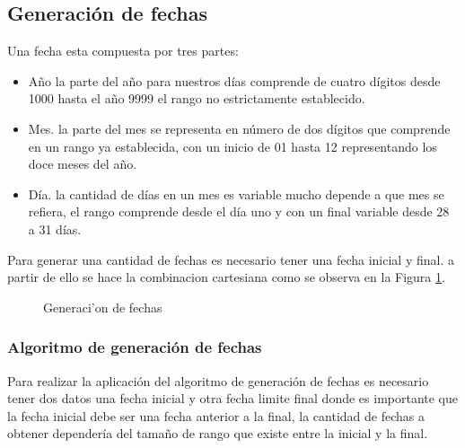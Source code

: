 \subsection{Generaci\'on de fechas}
Una fecha esta compuesta por tres partes:
\begin{itemize}
\item A\~no la parte del a\~no para nuestros d\'ias comprende de cuatro d\'igitos desde 1000 hasta el a\~no 9999 el rango no estrictamente establecido.
\item
Mes. la parte del mes se representa en n\'umero de dos d\'igitos que comprende en un rango ya establecida, con un inicio de 01 hasta 12 representando los doce meses del a\~no.
\item
 D\'ia. la cantidad de d\'ias en un mes es variable mucho depende a que mes se refiera, el rango comprende desde el d\'ia uno y con un final variable desde 28 a 31 d\'ias.
\end{itemize}
Para generar una cantidad de fechas es necesario tener una fecha inicial y final. a partir de ello se hace la combinacion cartesiana como se observa en la Figura \ref{fig:generacion de fechas}.
\begin{figure}[H]
\centering
{}
\caption{Generaci'on de fechas} \label{fig:generacion de fechas}
\end{figure}
\subsubsection{Algoritmo de generaci\'on de fechas}
Para realizar la aplicaci\'on del algoritmo de generaci\'on de fechas es necesario tener dos datos una fecha inicial y otra fecha limite final donde es importante que la fecha inicial debe ser una fecha anterior a la final, la cantidad de fechas a obtener depender\'ia del tama\~no de rango que existe entre la inicial y la final.

